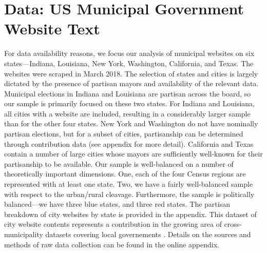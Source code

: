 \documentclass[11pt]{article}
\begin{document}
\section{Data: US Municipal Government Website Text}

For data availability reasons, we focus our analysis of municipal websites on six states---Indiana, Louisiana, New York, Washington, California, and Texas. The websites were scraped in March 2018. The selection of states and cities is largely dictated by the presence of partisan mayors and availability of the relevant data. Municipal elections in Indiana and Louisiana are partisan across the board, so our sample is primarily focused on these two states. For Indiana and Louisiana, all cities with a website are included, resulting in a considerably larger sample than for the other four states. New York and Washington do not have nominally partisan elections, but for a subset of cities, partisanship can be determined through contribution data (see appendix for more detail). California and Texas contain a number of large cities whose mayors are sufficiently well-known for their partisanship to be available. Our sample is well-balanced on a number of theoretically important dimensions. One, each of the four Census regions are represented with at least one state. Two, we have a fairly well-balanced sample with respect to the urban/rural cleavage. Furthermore, the sample is politically balanced---we have three blue states, and three red states.  The partisan breakdown of city websites by state is provided in the appendix. This dataset of city website contents represents a contribution in the growing area of cross-municipality datasets covering local governements \citep[e.g., ][]{marschall2013local,sumner2019}. Details on the sources and methods of raw data collection can be found in the online appendix.

\end{document}
